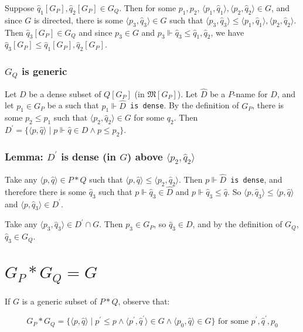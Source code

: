 \documentclass[12pt]{article}
\begin{document}
Suppose $\hat{q}_1[G_P],\hat{q}_2[G_P]\in G_Q$.  Then for some $p_1,p_2$, $\langle p_1,\hat{q}_1\rangle,\langle p_2,\hat{q}_2\rangle\in G$, and since $G$ is directed, there is some $\langle p_3,\hat{q}_3\rangle\in G$ such that $\langle p_3,\hat{q}_3\rangle\leq \langle p_1,\hat{q}_1\rangle,\langle p_2,\hat{q}_2\rangle$.  Then $\hat{q}_3[G_P]\in G_Q$ and since $p_3\in G$ and $p_3\Vdash \hat{q}_3\leq \hat{q}_1,\hat{q}_2$, we have $\hat{q}_3[G_P]\leq\hat{q}_1[G_P],\hat{q}_2[G_P]$.

\subsubsection*{$G_Q$ is generic}

Let $D$ be a dense subset of $Q[G_P]$ (in $\mathfrak{M}[G_P]$).  Let $\hat{D}$ be a $P$-name for $D$, and let $p_1\in G_P$ be a such that $p_1\Vdash \hat{D} $\texttt{ is dense}.  By the definition of $G_P$, there is some $p_2\leq p_1$ such that $\langle p_2,\hat{q}_2\rangle\in G$ for some $q_2$.  Then $D^\prime=\{\langle p,\hat{q}\rangle\mid p\Vdash \hat{q}\in D \wedge p\leq p_2\}$.

\subsubsection*{Lemma: $D^\prime$ is dense (in $G$) above $\langle p_2,\hat{q}_2\rangle$}

Take any $\langle p,\hat{q}\rangle\in P*Q$ such that $\langle p,\hat{q}\rangle\leq \langle p_2,\hat{q}_2\rangle$.  Then $p\Vdash \hat{D} $\texttt{ is dense}, and therefore there is some $\hat{q}_3$ such that $p\Vdash \hat{q}_3\in\hat{D}$ and $p\Vdash \hat{q}_3\leq\hat{q}$.  So $\langle p,\hat{q}_3\rangle\leq\langle p,\hat{q}\rangle$ and $\langle p,\hat{q}_3\rangle\in D^\prime$.

\bigskip{}
Take any $\langle p_3,\hat{q}_3\rangle\in D^\prime\cap G$.  Then $p_3\in G_P$, so $\hat{q}_3\in D$, and by the definition of $G_Q$, $\hat{q}_3\in G_Q$.

\section*{$G_P*G_Q=G$}

If $G$ is a generic subset of $P*Q$, observe that:

$$G_P*G_Q=\{\langle p,\hat{q}\rangle\mid p^\prime\leq p \wedge \langle p^\prime,\hat{q}^\prime\rangle\in G \wedge \langle p_0,\hat{q}\rangle\in G\} \text{ for some }p^\prime,\hat{q}^\prime,p_0$$
\end{document}
